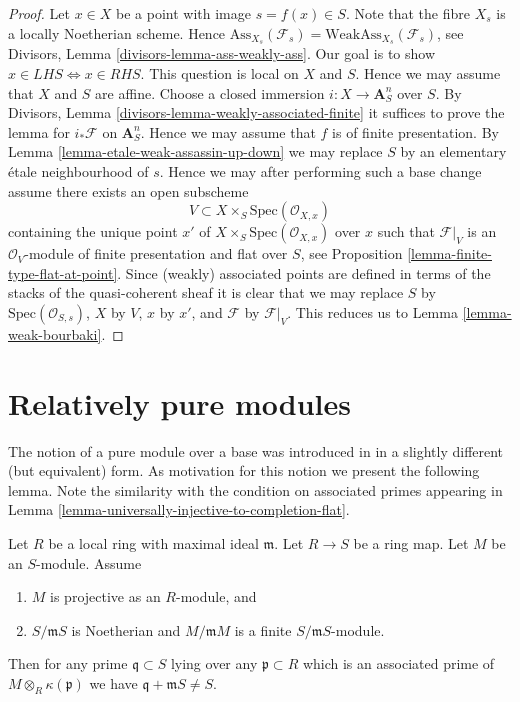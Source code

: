 \begin{proof}
Let $x \in X$ be a point with image $s = f(x) \in S$.
Note that the fibre $X_s$ is a locally Noetherian scheme.
Hence
$\text{Ass}_{X_s}(\mathcal{F}_s) = \text{WeakAss}_{X_s}(\mathcal{F}_s)$, see
Divisors, Lemma \ref{divisors-lemma-ass-weakly-ass}.
Our goal is to show $x \in LHS \Leftrightarrow x \in RHS$.
This question is local on $X$ and $S$. Hence we may assume that
$X$ and $S$ are affine. Choose a closed immersion $i : X \to \mathbf{A}^n_S$
over $S$. By
Divisors, Lemma \ref{divisors-lemma-weakly-associated-finite}
it suffices to prove the lemma for $i_*\mathcal{F}$ on $\mathbf{A}^n_S$.
Hence we may assume that $f$ is of finite presentation. By
Lemma \ref{lemma-etale-weak-assassin-up-down}
we may replace $S$ by an elementary \'etale neighbourhood of $s$.
Hence we may after performing such a base change assume there
exists an open subscheme
$$
V \subset X \times_S \text{Spec}(\mathcal{O}_{X, x})
$$
containing the unique point $x'$ of
$X \times_S \text{Spec}(\mathcal{O}_{X, x})$ over $x$
such that $\mathcal{F}|_V$ is an $\mathcal{O}_V$-module of finite
presentation and flat over $S$, see
Proposition \ref{lemma-finite-type-flat-at-point}.
Since (weakly) associated points are defined in terms of the stacks of
the quasi-coherent sheaf it is clear that we may replace
$S$ by $\text{Spec}(\mathcal{O}_{S, s})$, $X$ by $V$,
$x$ by $x'$, and $\mathcal{F}$ by $\mathcal{F}|_V$.
This reduces us to
Lemma \ref{lemma-weak-bourbaki}.
\end{proof}












\section{Relatively pure modules}
\label{section-pure}

\noindent
The notion of a pure module over a base was introduced in
\cite{GruRay} in a slightly different (but equivalent) form.
As motivation for this notion we present the following lemma.
Note the similarity with the condition on associated primes appearing in
Lemma \ref{lemma-universally-injective-to-completion-flat}.

\begin{lemma}
\label{lemma-explain-why-pure}
Let $R$ be a local ring with maximal ideal $\mathfrak m$.
Let $R \to S$ be a ring map. Let $M$ be an $S$-module.
Assume
\begin{enumerate}
\item $M$ is projective as an $R$-module, and
\item $S/\mathfrak mS$ is Noetherian and $M/\mathfrak mM$ is a finite
$S/\mathfrak mS$-module.
\end{enumerate}
Then for any prime $\mathfrak q \subset S$ lying over any
$\mathfrak p \subset R$ which is an associated prime of
$M \otimes_R \kappa(\mathfrak p)$ we have
$\mathfrak q + \mathfrak m S \not = S$.
\end{lemma}

